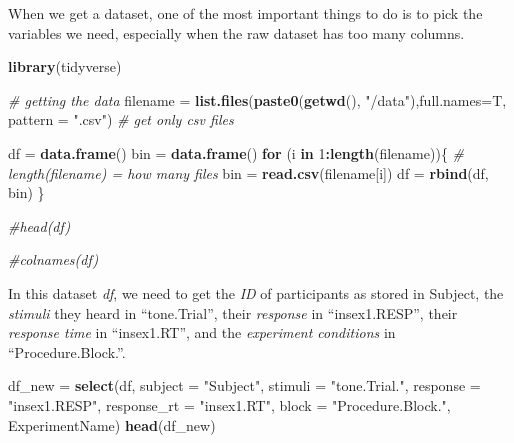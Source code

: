 \documentclass[]{book}
\newenvironment{Shaded}{\begin{snugshade}}{\end{snugshade}}
\newcommand{\KeywordTok}[1]{\textcolor[rgb]{0.13,0.29,0.53}{\textbf{#1}}}
\newcommand{\DataTypeTok}[1]{\textcolor[rgb]{0.13,0.29,0.53}{#1}}
\newcommand{\DecValTok}[1]{\textcolor[rgb]{0.00,0.00,0.81}{#1}}
\newcommand{\StringTok}[1]{\textcolor[rgb]{0.31,0.60,0.02}{#1}}
\newcommand{\CommentTok}[1]{\textcolor[rgb]{0.56,0.35,0.01}{\textit{#1}}}
\newcommand{\ControlFlowTok}[1]{\textcolor[rgb]{0.13,0.29,0.53}{\textbf{#1}}}
\newcommand{\OperatorTok}[1]{\textcolor[rgb]{0.81,0.36,0.00}{\textbf{#1}}}
\newcommand{\NormalTok}[1]{#1}
\begin{document}
When we get a dataset, one of the most important things to do is to pick
the variables we need, especially when the raw dataset has too many
columns.

\begin{Shaded}
\begin{Highlighting}[]
\KeywordTok{library}\NormalTok{(tidyverse)}

\CommentTok{# getting the data}
\NormalTok{filename =}\StringTok{ }\KeywordTok{list.files}\NormalTok{(}\KeywordTok{paste0}\NormalTok{(}\KeywordTok{getwd}\NormalTok{(), }\StringTok{"/data"}\NormalTok{),}\DataTypeTok{full.names=}\NormalTok{T, }\DataTypeTok{pattern =} \StringTok{".csv"}\NormalTok{) }\CommentTok{# get only csv files}

\NormalTok{df =}\StringTok{ }\KeywordTok{data.frame}\NormalTok{()}
\NormalTok{bin =}\StringTok{ }\KeywordTok{data.frame}\NormalTok{()}
\ControlFlowTok{for}\NormalTok{ (i }\ControlFlowTok{in} \DecValTok{1}\OperatorTok{:}\KeywordTok{length}\NormalTok{(filename))\{}
  \CommentTok{# length(filename) = how many files}
\NormalTok{  bin =}\StringTok{ }\KeywordTok{read.csv}\NormalTok{(filename[i])}
\NormalTok{  df =}\StringTok{ }\KeywordTok{rbind}\NormalTok{(df, bin)}
\NormalTok{\}}

\CommentTok{#head(df)}

\CommentTok{#colnames(df)}
\end{Highlighting}
\end{Shaded}

In this dataset \emph{df}, we need to get the \emph{ID} of participants
as stored in Subject, the \emph{stimuli} they heard in ``tone.Trial'',
their \emph{response} in ``insex1.RESP'', their \emph{response time} in
``insex1.RT'', and the \emph{experiment conditions} in
``Procedure.Block.''.

\begin{Shaded}
\begin{Highlighting}[]
\NormalTok{df_new =}\StringTok{ }\KeywordTok{select}\NormalTok{(df, }\DataTypeTok{subject =} \StringTok{"Subject"}\NormalTok{,}
                \DataTypeTok{stimuli =} \StringTok{"tone.Trial."}\NormalTok{,}
                \DataTypeTok{response =} \StringTok{"insex1.RESP"}\NormalTok{,}
                \DataTypeTok{response_rt =} \StringTok{"insex1.RT"}\NormalTok{,}
                \DataTypeTok{block =} \StringTok{"Procedure.Block."}\NormalTok{,}
\NormalTok{                ExperimentName)}
\KeywordTok{head}\NormalTok{(df_new)}
\end{Highlighting}
\end{Shaded}
\end{document}
